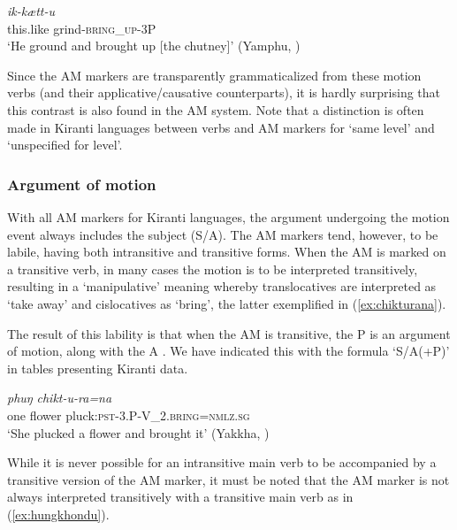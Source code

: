 \documentclass[oneside,a4paper,11pt]{article}
\newcommand{\ipa}[1]{{\phon\textit{#1}}}
\newcommand{\sens}[1]{‘#1’}
\newcommand{\rouge}[1]{{\color{red}#1}}
\begin{document}
\begin{exe}
\ex \label{ex:ikkaettu}
 \gll \ipa{i.doʔ}	\ipa{ik-\rouge{kætt}-u} \\
this.like grind-\textsc{\rouge{bring\_up}}-3P \\
\glt \sens{He ground and brought up [the chutney]} (Yamphu, \citealt[144]{rutgers98yamphu})
\end{exe}

 Since the AM markers are transparently grammaticalized from these motion verbs (and their applicative/causative counterparts), it is hardly surprising that this contrast is also found in the AM system.
Note that a distinction is often made in Kiranti languages between verbs and AM markers for `same level' and `unspecified for level'.

 

  \subsubsection{Argument of motion} \label{sec:argument.khaling}
With all AM markers for Kiranti languages, the argument undergoing the motion event always includes the subject (S/A).  The AM markers tend, however, to be labile, having both intransitive and transitive forms.  When the AM is marked on a transitive verb, in many cases the motion is to be interpreted transitively, resulting in a `manipulative' meaning whereby translocatives are interpreted as `take away' and cislocatives as `bring', the latter exemplified in (\ref{ex:chikturana}).

The result of this lability is that when the AM is transitive, the P is an argument of motion, along with the A .
We have indicated this with the formula `S/A(+P)' in tables presenting Kiranti data.
 
\begin{exe}
\ex \label{ex:chikturana}
 \gll  \ipa{eko}	\ipa{phuŋ}	\ipa{chikt-u-\rouge{ra}=na} \\
one flower pluck:\textsc{pst}-3.P-\rouge{V_2.\textsc{bring}}=\textsc{nmlz.sg} \\
\glt \sens{She plucked a flower and brought it} (Yakkha, \citealt[312]{schackow15yakkha})
\end{exe}

While it is never possible for an intransitive main verb to be accompanied by a transitive version of the AM marker, it must be noted that the AM marker is not always interpreted transitively with a transitive main verb as in (\ref{ex:hungkhondu}). 
\end{document}
